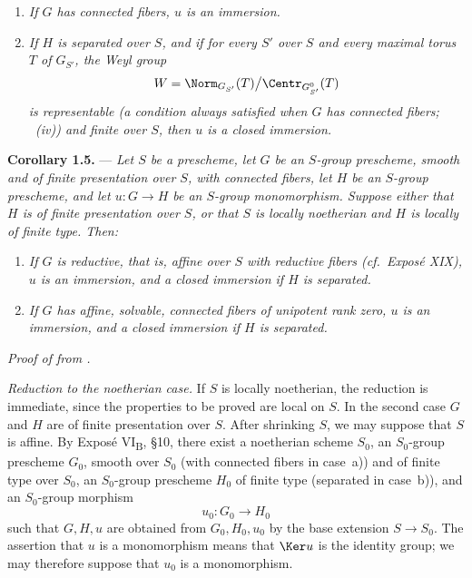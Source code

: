 \begin{enumerate}
\item[\textit{a)}] \textit{If \(G\) has connected fibers, \(u\) is
an immersion.}

\item[\textit{b)}] \textit{If \(H\) is separated over \(S\), and if
for every \(S'\) over \(S\) and every maximal torus \(T\) of
\(G_{S'}\), the Weyl group}
\[
  W=
  \Norm_{G_{S'}}(T)\big/\Centr_{G_{S'}^0}(T)
\]
\textit{is representable (a condition always satisfied when \(G\)
has connected fibers; ~(iv)) and finite over \(S\), then
\(u\) is a closed immersion.}
\end{enumerate}

\medskip
\noindent{}%
\textbf{Corollary 1.5.} --- \textit{Let \(S\) be a prescheme, let
\(G\) be an \(S\)-group prescheme, smooth and of finite presentation
over \(S\), with connected fibers, let \(H\) be an \(S\)-group
prescheme, and let \(u:G\to H\) be an \(S\)-group monomorphism.
Suppose either that \(H\) is of finite presentation over \(S\), or
that \(S\) is locally noetherian and \(H\) is locally of finite type.
Then:}

\begin{enumerate}
\item[\textit{a)}] \textit{If \(G\) is reductive, that is, affine
over \(S\) with reductive fibers (cf.\ Exposé XIX), \(u\) is an
immersion, and a closed immersion if \(H\) is separated.}

\item[\textit{b)}] \textit{If \(G\) has affine, solvable, connected
fibers of unipotent rank zero, \(u\) is an immersion, and a closed
immersion if \(H\) is separated.}
\end{enumerate}

\medskip
\noindent\textit{Proof of  from .}

\smallskip
\noindent\textit{Reduction to the noetherian case.}
If \(S\) is locally noetherian, the reduction is immediate, since the
properties to be proved are local on \(S\). In the second case \(G\)
and \(H\) are of finite presentation over \(S\). After shrinking
\(S\), we may suppose that \(S\) is affine. By Exposé
VI\textsubscript{B}, \S10, there exist a noetherian scheme \(S_0\), an
\(S_0\)-group prescheme \(G_0\), smooth over \(S_0\) (with connected
fibers in case~a)) and of finite type over \(S_0\), an
\(S_0\)-group prescheme \(H_0\) of finite type (separated in case~b)),
and an \(S_0\)-group morphism
\[
  u_0:G_0\longrightarrow H_0
\]
such that \(G,H,u\) are obtained from \(G_0,H_0,u_0\) by the base
extension \(S\to S_0\). The assertion that \(u\) is a monomorphism
means that \(\Ker u\) is the identity group; we may therefore suppose
that \(u_0\) is a monomorphism.

